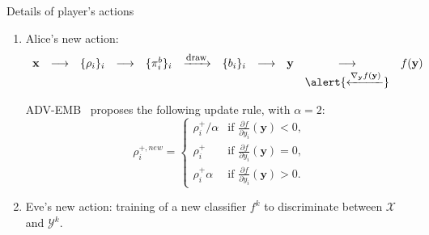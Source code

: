 \documentclass[10pt,aspectratio=169]{beamer}
\begin{document}
\begin{frame}{Details of player's actions}

    \begin{enumerate}

        \item \alert{Alice's new action:}
            \begin{equation*}
                \begin{array}{ccccccccccc}
                    \mathbf{x} & \longrightarrow & \{\rho_i\}_i & \longrightarrow & \{\pi_i^b\}_i &   \xrightarrow{\mbox{\footnotesize{draw}}} & \{b_i\}_i &  \longrightarrow & \mathbf{y} & \longrightarrow  & f(\mathbf{y}) \\
                    & & & & & & & & & \alert{\xleftarrow{ \nabla_{\mathbf{y}} f(\mathbf{y}) }} 
                \end{array}    
            \end{equation*}

        ADV-EMB~ proposes the following update rule, with $\alpha=2$:
        \begin{equation}
            \rho_{i}^{+, new} = 
            \left\{
                \begin{array}{ll}
                    \rho_{i}^+/\alpha & \mbox{if } \frac{\partial f}{\partial y_{i}}\left(\mathbf{y}\right) < 0, \\
                    \rho_{i}^+ & \mbox{if } \frac{\partial f}{\partial y_{i}}\left(\mathbf{y}\right) = 0, \\
                    \rho_{i}^+ \alpha & \mbox{if } \frac{\partial f}{\partial y_{i}}\left(\mathbf{y}\right) > 0.
                \end{array}
            \right.
            \label{eq:qplus}
        \end{equation}

        \pause
        \item \alert{Eve's new action:} training of a new classifier $f^k$ to discriminate between $\mathcal{X}$ and $\mathcal{Y}^k$.

    \end{enumerate}

\end{frame}







\end{document}
